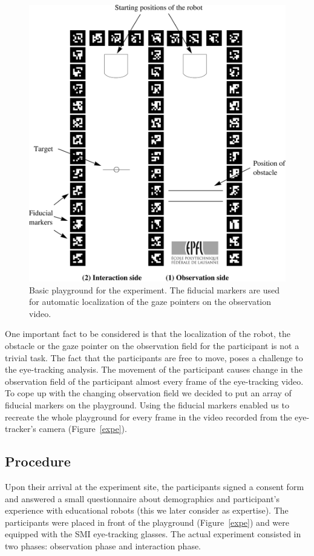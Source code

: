 \documentclass{sig-alternate}
\begin{document}
\begin{figure}
    \centering
    \includegraphics[width=0.9\linewidth]{maze}
    \caption{\small Basic playground for the experiment. The fiducial markers
    are used for automatic localization of the gaze pointers on the observation
    video.}

    \label{playground}
\end{figure}

One important fact to be considered is that the localization of the
robot, the obstacle or the gaze pointer on the observation field for the
participant is not a trivial task. The fact that the participants are
free to move, poses a challenge to the eye-tracking analysis. The
movement of the participant causes change in the observation field of
the participant almost every frame of the eye-tracking video. To cope up
with the changing observation field we decided to put an array of
fiducial markers on the playground. Using the fiducial markers enabled
us to recreate the whole playground for every frame in the video
recorded from the eye-tracker's camera (Figure~\ref{expe}).

\subsection{Procedure}

Upon their arrival at the experiment site, the participants signed a
consent form and answered a small questionnaire about demographics and
participant's experience with educational robots (this we later consider
as expertise). The participants were placed in front of the playground
(Figure~\ref{expe}) and were equipped with the SMI eye-tracking glasses. The
actual experiment consisted in two phases: observation phase and
interaction phase.
\end{document}
